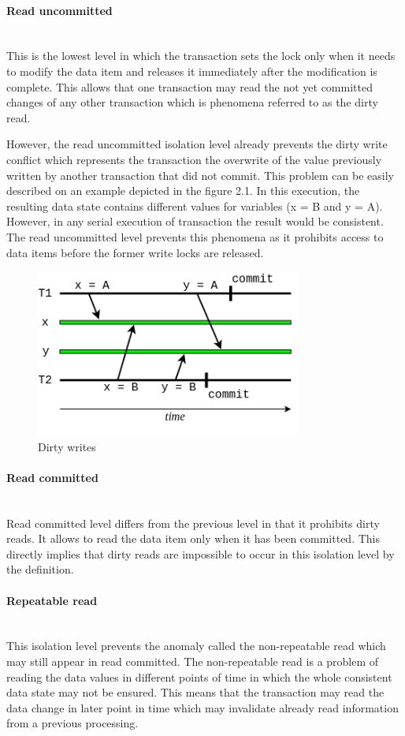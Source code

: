 \documentclass[oneside,
  digital, %
  table,   %
  nolof,     %
  nolot,     %
]{fithesis3}
\newcommand{\newlinepar}[1]{\paragraph{#1}\needspace{4\baselineskip}\mbox{}\\}
\begin{document}
\newlinepar{Read uncommitted}

This is the lowest level in which the transaction sets the lock only when it needs to modify the data item and releases it immediately after the modification is complete. This allows that one transaction may read the not yet committed changes of any other transaction which is phenomena referred to as the dirty read.

However, the read uncommitted isolation level already prevents the dirty write conflict which represents the transaction the overwrite of the value previously written by another transaction that did not commit. This problem can be easily described on an example depicted in the figure 2.1. In this execution, the resulting data state contains different values for variables (x = B and y = A). However, in any serial execution of transaction the result would be consistent. The read uncommitted level prevents this phenomena as it prohibits access to data items before the former write locks are released.

\begin{figure}
    \begin{center}
        \includegraphics[height=55mm]{images/dirtyWrite.png}
    \end{center}
    \caption{Dirty writes}
\end{figure}


\newlinepar{Read committed}

Read committed level differs from the previous level in that it prohibits dirty reads. It allows to read the data item only when it has been committed. This directly implies that dirty reads are impossible to occur in this isolation level by the definition.


\newlinepar{Repeatable read}

This isolation level prevents the anomaly called the non-repeatable read which may still appear in read committed. The non-repeatable read is a problem of reading the data values in different points of time in which the whole consistent data state may not be ensured. This means that the transaction may read the data change in later point in time which may invalidate already read information from a previous processing.
\end{document}
